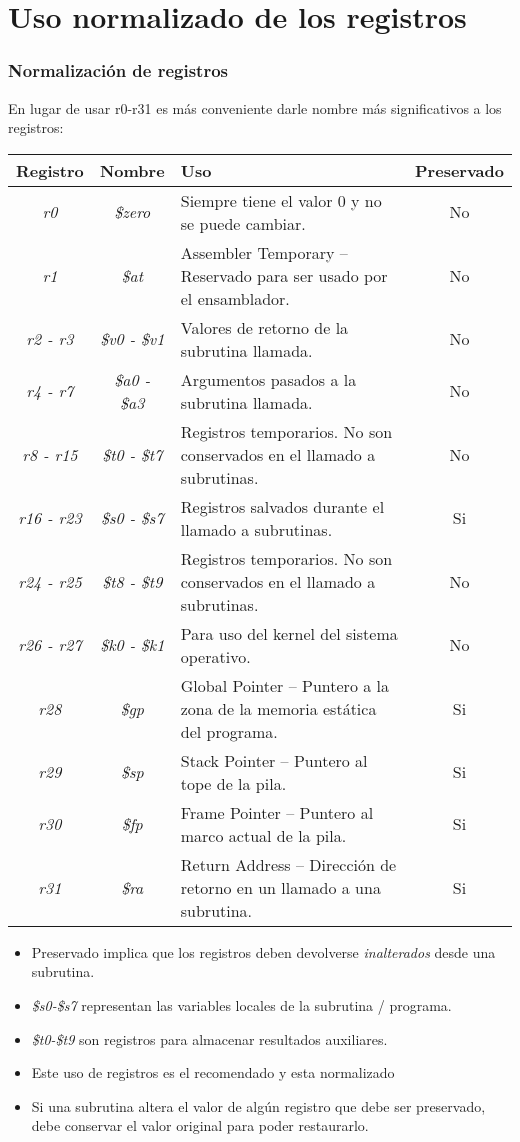 \documentclass{beamer}
\begin{document}
\section{Uso normalizado de los registros}
\begin{frame}
\frametitle{Normalización de registros}
En lugar de usar r0-r31 es más conveniente darle nombre más significativos a los registros:
\tiny{
\begin{tabular}{| c | c | p{6.5cm} | c |}
\hline
Registro & Nombre & Uso & Preservado \\ \hline
\emph{r0} & \emph{\$zero} & Siempre tiene el valor 0 y no se puede cambiar. & No \\ \hline
\emph{r1} & \emph{\$at} & Assembler Temporary – Reservado para ser usado por el ensamblador. & No \\ \hline
\emph{r2 - r3} & \emph{\$v0 - \$v1} & Valores de retorno de la subrutina llamada. & No \\ \hline
\emph{r4 - r7} & \emph{\$a0 - \$a3} & Argumentos pasados a la subrutina llamada. & No \\ \hline
\emph{r8 - r15} & \emph{\$t0 - \$t7} & Registros temporarios. No son conservados en el llamado a subrutinas. & No \\ \hline
\emph{r16 - r23} & \emph{\$s0 - \$s7} &  Registros salvados durante el llamado a subrutinas. & Si \\ \hline
\emph{r24 - r25} & \emph{\$t8 - \$t9} & Registros temporarios. No son conservados en el llamado a subrutinas. & No \\ \hline
\emph{r26 - r27} & \emph{\$k0 - \$k1} & Para uso del kernel del sistema operativo. & No \\ \hline
\emph{r28} & \emph{\$gp} & Global Pointer – Puntero a la zona de la memoria estática del programa. & Si \\ \hline
\emph{r29} & \emph{\$sp} & Stack Pointer – Puntero al tope de la pila. & Si \\ \hline
\emph{r30} & \emph{\$fp} & Frame Pointer – Puntero al marco actual de la pila. & Si \\ \hline
\emph{r31} & \emph{\$ra} & Return Address – Dirección de retorno en un llamado a una subrutina. & Si \\ \hline
		
\end{tabular}	
}
\begin{itemize}
\item Preservado implica que los registros deben devolverse \emph{inalterados} desde una subrutina.
\item \emph{\$s0-\$s7} representan las variables locales de la subrutina / programa.
\item \emph{\$t0-\$t9} son registros para almacenar resultados auxiliares.
\item Este uso de registros es el recomendado y esta normalizado
\item Si una subrutina altera el valor de algún registro que debe ser preservado, debe conservar el valor original para poder restaurarlo.
\end{itemize}

\end{frame}
\end{document}
